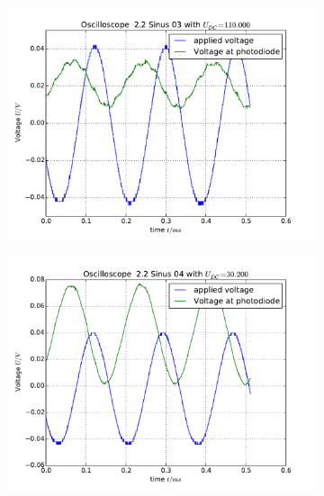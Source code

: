 \begin{figure}
\begin{subfigure}[b]{\picwidth}
        \caption{}
    \end{subfigure}
    \begin{subfigure}[b]{\picwidth}
        \includegraphics[width=\textwidth]{analysis/figures/22sinus03}
        \caption{}
    \end{subfigure}
    \begin{subfigure}[b]{\picwidth}
        \includegraphics[width=\textwidth]{analysis/figures/22sinus04}
        \caption{}
    \end{subfigure}
    \begin{subfigure}[b]{\picwidth}

\end{subfigure}
\end{figure}
